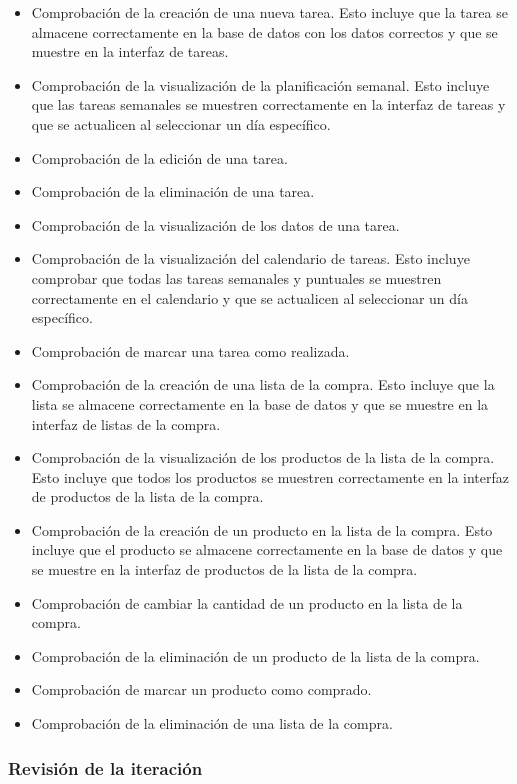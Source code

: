 \begin{itemize}
    \item Comprobación de la creación de una nueva tarea. Esto incluye que la tarea se almacene correctamente en la base de datos con los datos correctos y que se muestre en la interfaz de tareas.
    \item Comprobación de la visualización de la planificación semanal. Esto incluye que las tareas semanales se muestren correctamente en la interfaz de tareas y que se actualicen al seleccionar un día específico.
    \item Comprobación de la edición de una tarea.
    \item Comprobación de la eliminación de una tarea.
    \item Comprobación de la visualización de los datos de una tarea.
    \item Comprobación de la visualización del calendario de tareas. Esto incluye comprobar que todas las tareas semanales y puntuales se muestren correctamente en el calendario y que se actualicen al seleccionar un día específico.
    \item Comprobación de marcar una tarea como realizada.
    \item Comprobación de la creación de una lista de la compra. Esto incluye que la lista se almacene correctamente en la base de datos y que se muestre en la interfaz de listas de la compra.
    \item Comprobación de la visualización de los productos de la lista de la compra. Esto incluye que todos los productos se muestren correctamente en la interfaz de productos de la lista de la compra.
    \item Comprobación de la creación de un producto en la lista de la compra. Esto incluye que el producto se almacene correctamente en la base de datos y que se muestre en la interfaz de productos de la lista de la compra.
    \item Comprobación de cambiar la cantidad de un producto en la lista de la compra.
    \item Comprobación de la eliminación de un producto de la lista de la compra.
    \item Comprobación de marcar un producto como comprado. 
    \item Comprobación de la eliminación de una lista de la compra.
\end{itemize}

\subsubsection{Revisión de la iteración}

